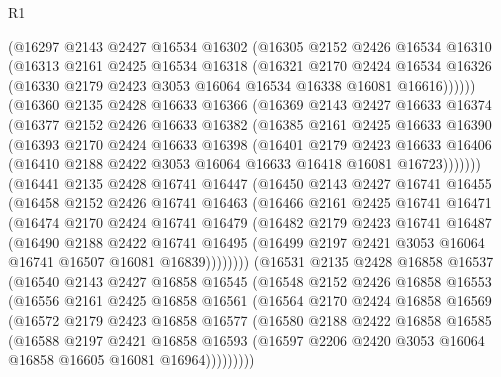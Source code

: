 \begin{lexlean}{R1}
\begin{coremodule}
      (@16297
        @2143
        @2427
        @16534
        @16302
        (@16305
          @2152
          @2426
          @16534
          @16310
          (@16313
            @2161
            @2425
            @16534
            @16318
            (@16321
              @2170
              @2424
              @16534
              @16326
              (@16330 @2179 @2423 @3053 @16064 @16534 @16338 @16081 @16616))))))
    (@16360
      @2135
      @2428
      @16633
      @16366
      (@16369
        @2143
        @2427
        @16633
        @16374
        (@16377
          @2152
          @2426
          @16633
          @16382
          (@16385
            @2161
            @2425
            @16633
            @16390
            (@16393
              @2170
              @2424
              @16633
              @16398
              (@16401
                @2179
                @2423
                @16633
                @16406
                (@16410 @2188 @2422 @3053 @16064 @16633 @16418 @16081 @16723)))))))
    (@16441
      @2135
      @2428
      @16741
      @16447
      (@16450
        @2143
        @2427
        @16741
        @16455
        (@16458
          @2152
          @2426
          @16741
          @16463
          (@16466
            @2161
            @2425
            @16741
            @16471
            (@16474
              @2170
              @2424
              @16741
              @16479
              (@16482
                @2179
                @2423
                @16741
                @16487
                (@16490
                  @2188
                  @2422
                  @16741
                  @16495
                  (@16499 @2197 @2421 @3053 @16064 @16741 @16507 @16081 @16839))))))))
    (@16531
      @2135
      @2428
      @16858
      @16537
      (@16540
        @2143
        @2427
        @16858
        @16545
        (@16548
          @2152
          @2426
          @16858
          @16553
          (@16556
            @2161
            @2425
            @16858
            @16561
            (@16564
              @2170
              @2424
              @16858
              @16569
              (@16572
                @2179
                @2423
                @16858
                @16577
                (@16580
                  @2188
                  @2422
                  @16858
                  @16585
                  (@16588
                    @2197
                    @2421
                    @16858
                    @16593
                    (@16597 @2206 @2420 @3053 @16064 @16858 @16605 @16081 @16964)))))))))

\end{coremodule}
\end{lexlean}
